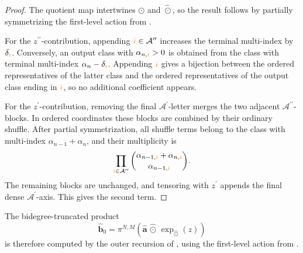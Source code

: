 \documentclass{amsart}
\theoremstyle{definition}
\theoremstyle{remark}
\newcommand{\orange}[1]{{\color{orange}#1}}
\begin{document}
\begin{proof}
The quotient map intertwines $\odot$ and $\widehat{\odot}$, so the result
follows by partially symmetrizing the first-level action from
.

For the $z^{\prime\prime}$-contribution, appending
$\orange{i}\in\mathcal{A}^{\prime\prime}$ increases the terminal
multi-index by $\delta_{\orange{i}}$. Conversely, an output class with
$\alpha_{n,\orange{i}}>0$ is obtained from the class with terminal
multi-index
$\alpha_n-\delta_{\orange{i}}$. Appending $\orange{i}$ gives a bijection
between the ordered representatives of the latter class and the ordered
representatives of the output class ending in $\orange{i}$, so no
additional coefficient appears.

For the $z^{\prime}$-contribution, removing the final
$\mathcal{A}^{\prime}$-letter merges the two adjacent
$\mathcal{A}^{\prime\prime}$-blocks. In ordered coordinates these
blocks are combined by their ordinary shuffle. After partial
symmetrization, all shuffle terms belong to the class with multi-index
$\alpha_{n-1}+\alpha_n$, and their multiplicity is
\[
    \prod_{\orange{i}\in\mathcal{A}^{\prime\prime}}
    \binom{
        \alpha_{n-1,\orange{i}}
        +
        \alpha_{n,\orange{i}}
    }{
        \alpha_{n-1,\orange{i}}
    }.
\]
The remaining blocks are unchanged, and tensoring with $z^{\prime}$
appends the final dense $\mathcal{A}^{\prime}$-axis. This gives the second
term.
\end{proof}

The bidegree-truncated product
\[
    \widehat{\mathbf{b}}_0
    =
    \pi^{N,M}
    \left(
        \widehat{\mathbf{a}}
        \,\widehat{\odot}\,
        \exp_{\widehat{\odot}}(z)
    \right)
\]
is therefore computed by the outer recursion of
, using the first-level action from
.
\end{document}
